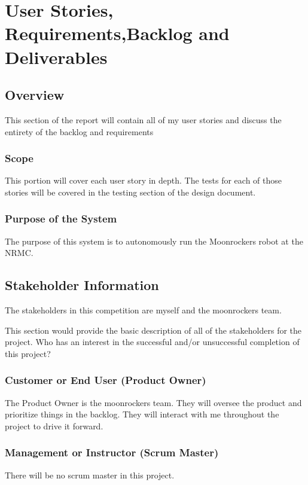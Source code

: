 \chapter{User Stories,  Requirements,Backlog and Deliverables}
\section{Overview}
This section of the report will contain all of my user stories and discuss the entirety of the backlog and requirements


\subsection{Scope}

This portion will cover each user story in depth. The tests for each of those stories will be covered in the testing section of the design document.



\subsection{Purpose of the System}
The purpose of this system is to autonomously run the Moonrockers robot at the NRMC.


\section{ Stakeholder Information}

The stakeholders in this competition are myself and the moonrockers team.

This section would provide the basic description of all of the stakeholders for 
the project.  Who has an interest in the successful and/or unsuccessful completion 
of this project? 


\subsection{Customer or End User (Product Owner)}
The Product Owner is the moonrockers team. They will oversee the product and prioritize things in the backlog. They will interact with me throughout the project to drive it forward.

\subsection{Management or Instructor (Scrum Master)}
There will be no scrum master in this project.



